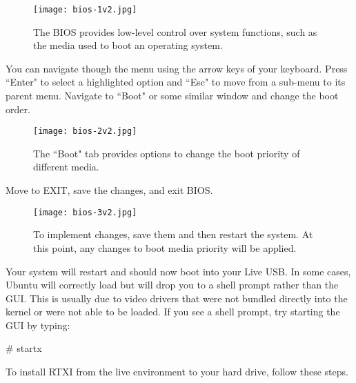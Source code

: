 \begin{enumerate}
\begin{figure}[h]
\begin{center}
\texttt{[image: bios-1v2.jpg]}
\caption[BIOS page]{The BIOS provides low-level control over system functions, such as the media used to boot an operating system.}
\end{center}
\end{figure}

You can navigate though the menu using the arrow keys of your keyboard. Press ``Enter" to select a highlighted option and ``Esc" to move from a sub-menu to its parent menu. Navigate to ``Boot" or some similar window and change the boot order. 

\begin{figure}[h]
\begin{center}
\texttt{[image: bios-2v2.jpg]}
\caption[BIOS boot order]{The ``Boot" tab provides options to change the boot priority of different media.}
\end{center}
\end{figure}

Move to EXIT, save the changes, and exit BIOS. 

\begin{figure}[h]
\begin{center}
\texttt{[image: bios-3v2.jpg]}
\caption[BIOS exit]{To implement changes, save them and then restart the system. At this point, any changes to boot media priority will be applied.}
\end{center}
\end{figure}

Your system will restart and should now boot into your Live USB. In some cases, Ubuntu will correctly load but will drop you to a shell prompt rather than the GUI. This is usually due to video drivers that were not bundled directly into the kernel or were not able to be loaded. If you see a shell prompt, try starting the GUI by typing:

\begin{example}
\# startx
\end{example}
\end{enumerate}

To install RTXI from the live environment to your hard drive, follow these steps. 


